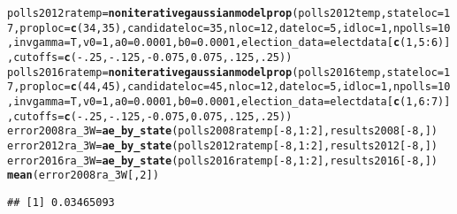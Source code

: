 \documentclass{article}\usepackage[]{graphicx}\usepackage[]{color}
\makeatletter
\newcommand{\hlnum}[1]{\textcolor[rgb]{0.686,0.059,0.569}{#1}}%
\newcommand{\hlopt}[1]{\textcolor[rgb]{0,0,0}{#1}}%
\newcommand{\hlstd}[1]{\textcolor[rgb]{0.345,0.345,0.345}{#1}}%
\newcommand{\hlkwb}[1]{\textcolor[rgb]{0.69,0.353,0.396}{#1}}%
\newcommand{\hlkwc}[1]{\textcolor[rgb]{0.333,0.667,0.333}{#1}}%
\newcommand{\hlkwd}[1]{\textcolor[rgb]{0.737,0.353,0.396}{\textbf{#1}}}%
\newenvironment{kframe}{%
 \def\at@end@of@kframe{}%
 \ifinner\ifhmode%
  \def\at@end@of@kframe{\end{minipage}}%
  \begin{minipage}{\columnwidth}%
 \fi\fi%
 \def\FrameCommand##1{\hskip\@totalleftmargin \hskip-\fboxsep
 \colorbox{shadecolor}{##1}\hskip-\fboxsep
     \hskip-\linewidth \hskip-\@totalleftmargin \hskip\columnwidth}%
 \MakeFramed {\advance\hsize-\width
   \@totalleftmargin\z@ \linewidth\hsize
   \@setminipage}}%
 {\par\unskip\endMakeFramed%
 \at@end@of@kframe}
\newenvironment{knitrout}{}{} %
\makeatother
\begin{document}
\begin{knitrout}
\begin{kframe}
\begin{alltt}
\hlstd{polls2012ratemp} \hlkwb{=} \hlkwd{noniterativegaussianmodelprop}\hlstd{(polls2012temp,} \hlkwc{stateloc} \hlstd{=} \hlnum{17}\hlstd{,} \hlkwc{proploc} \hlstd{=} \hlkwd{c}\hlstd{(}\hlnum{34}\hlstd{,} \hlnum{35}\hlstd{),} \hlkwc{candidateloc} \hlstd{=} \hlnum{35}\hlstd{,}  \hlkwc{nloc} \hlstd{=} \hlnum{12}\hlstd{,} \hlkwc{dateloc} \hlstd{=} \hlnum{5}\hlstd{,} \hlkwc{idloc} \hlstd{=} \hlnum{1}\hlstd{,}  \hlkwc{npolls} \hlstd{=} \hlnum{10}\hlstd{,}\hlkwc{invgamma} \hlstd{= T,} \hlkwc{v0}\hlstd{=}\hlnum{1}\hlstd{,} \hlkwc{a0}\hlstd{=}\hlnum{0.0001}\hlstd{,} \hlkwc{b0}\hlstd{=}\hlnum{0.0001}\hlstd{,}  \hlkwc{election_data} \hlstd{= electdata[}\hlkwd{c}\hlstd{(}\hlnum{1}\hlstd{,} \hlnum{5}\hlopt{:}\hlnum{6}\hlstd{)],} \hlkwc{cutoffs} \hlstd{=} \hlkwd{c}\hlstd{(}\hlopt{-}\hlnum{.25}\hlstd{,} \hlopt{-}\hlnum{.125}\hlstd{,} \hlopt{-}\hlnum{0.075}\hlstd{,} \hlnum{0.075}\hlstd{,} \hlnum{.125}\hlstd{,} \hlnum{.25}\hlstd{))}
\hlstd{polls2016ratemp} \hlkwb{=} \hlkwd{noniterativegaussianmodelprop}\hlstd{(polls2016temp,} \hlkwc{stateloc} \hlstd{=} \hlnum{17}\hlstd{,} \hlkwc{proploc} \hlstd{=} \hlkwd{c}\hlstd{(}\hlnum{44}\hlstd{,} \hlnum{45}\hlstd{),} \hlkwc{candidateloc} \hlstd{=} \hlnum{45}\hlstd{,} \hlkwc{nloc} \hlstd{=} \hlnum{12}\hlstd{,} \hlkwc{dateloc} \hlstd{=} \hlnum{5}\hlstd{,} \hlkwc{idloc} \hlstd{=} \hlnum{1}\hlstd{,}\hlkwc{npolls} \hlstd{=} \hlnum{10}\hlstd{,} \hlkwc{invgamma} \hlstd{= T,} \hlkwc{v0}\hlstd{=}\hlnum{1}\hlstd{,} \hlkwc{a0}\hlstd{=}\hlnum{0.0001}\hlstd{,} \hlkwc{b0}\hlstd{=}\hlnum{0.0001}\hlstd{,} \hlkwc{election_data} \hlstd{= electdata[}\hlkwd{c}\hlstd{(}\hlnum{1}\hlstd{,} \hlnum{6}\hlopt{:}\hlnum{7}\hlstd{)],} \hlkwc{cutoffs} \hlstd{=} \hlkwd{c}\hlstd{(}\hlopt{-}\hlnum{.25}\hlstd{,} \hlopt{-}\hlnum{.125}\hlstd{,} \hlopt{-}\hlnum{0.075}\hlstd{,} \hlnum{0.075}\hlstd{,} \hlnum{.125}\hlstd{,} \hlnum{.25}\hlstd{))}
\hlstd{error2008ra_3W} \hlkwb{=} \hlkwd{ae_by_state}\hlstd{(polls2008ratemp[}\hlopt{-}\hlnum{8}\hlstd{,} \hlnum{1}\hlopt{:}\hlnum{2}\hlstd{], results2008[}\hlopt{-}\hlnum{8}\hlstd{, ])}
\hlstd{error2012ra_3W} \hlkwb{=} \hlkwd{ae_by_state}\hlstd{(polls2012ratemp[}\hlopt{-}\hlnum{8}\hlstd{,} \hlnum{1}\hlopt{:}\hlnum{2}\hlstd{], results2012[}\hlopt{-}\hlnum{8}\hlstd{, ])}
\hlstd{error2016ra_3W} \hlkwb{=} \hlkwd{ae_by_state}\hlstd{(polls2016ratemp[}\hlopt{-}\hlnum{8}\hlstd{,} \hlnum{1}\hlopt{:}\hlnum{2}\hlstd{], results2016[}\hlopt{-}\hlnum{8}\hlstd{, ])}
\hlkwd{mean}\hlstd{(error2008ra_3W[,}\hlnum{2}\hlstd{])}
\end{alltt}
\begin{verbatim}
## [1] 0.03465093

\end{verbatim}
\end{kframe}
\end{knitrout}
\end{document}
